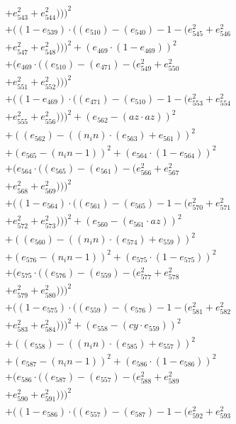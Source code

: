 \documentclass[10pt, a4paper]{article}
\begin{document}
\begin{small}
\begin{align*}
& + e_{543}^{2} + e_{544}^{2})))^{2} \\
& + ((1 - e_{539})  \cdot  ((e_{510}) - (e_{540}) - 1 - (e_{545}^{2} + e_{546}^{2} \\
& + e_{547}^{2} + e_{548}^{2})))^{2} + (e_{469}  \cdot  (1 - e_{469}))^{2} \\
& + (e_{469}  \cdot  ((e_{510}) - (e_{471}) - (e_{549}^{2} + e_{550}^{2} \\
& + e_{551}^{2} + e_{552}^{2})))^{2} \\
& + ((1 - e_{469})  \cdot  ((e_{471}) - (e_{510}) - 1 - (e_{553}^{2} + e_{554}^{2} \\
& + e_{555}^{2} + e_{556}^{2})))^{2} + (e_{562} - (az  \cdot  az))^{2} \\
& + ((e_{562}) - ((n_in)  \cdot  (e_{563}) + e_{561}))^{2} \\
& + (e_{565} - (n_in - 1))^{2} + (e_{564}  \cdot  (1 - e_{564}))^{2} \\
& + (e_{564}  \cdot  ((e_{565}) - (e_{561}) - (e_{566}^{2} + e_{567}^{2} \\
& + e_{568}^{2} + e_{569}^{2})))^{2} \\
& + ((1 - e_{564})  \cdot  ((e_{561}) - (e_{565}) - 1 - (e_{570}^{2} + e_{571}^{2} \\
& + e_{572}^{2} + e_{573}^{2})))^{2} + (e_{560} - (e_{561}  \cdot  az))^{2} \\
& + ((e_{560}) - ((n_in)  \cdot  (e_{574}) + e_{559}))^{2} \\
& + (e_{576} - (n_in - 1))^{2} + (e_{575}  \cdot  (1 - e_{575}))^{2} \\
& + (e_{575}  \cdot  ((e_{576}) - (e_{559}) - (e_{577}^{2} + e_{578}^{2} \\
& + e_{579}^{2} + e_{580}^{2})))^{2} \\
& + ((1 - e_{575})  \cdot  ((e_{559}) - (e_{576}) - 1 - (e_{581}^{2} + e_{582}^{2} \\
& + e_{583}^{2} + e_{584}^{2})))^{2} + (e_{558} - (cy  \cdot  e_{559}))^{2} \\
& + ((e_{558}) - ((n_in)  \cdot  (e_{585}) + e_{557}))^{2} \\
& + (e_{587} - (n_in - 1))^{2} + (e_{586}  \cdot  (1 - e_{586}))^{2} \\
& + (e_{586}  \cdot  ((e_{587}) - (e_{557}) - (e_{588}^{2} + e_{589}^{2} \\
& + e_{590}^{2} + e_{591}^{2})))^{2} \\
& + ((1 - e_{586})  \cdot  ((e_{557}) - (e_{587}) - 1 - (e_{592}^{2} + e_{593}^{2} \\

\end{align*}
\end{small}
\end{document}
